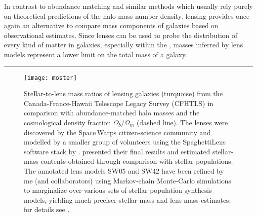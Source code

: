 In contrast to abundance matching and similar methods which usually rely purely
on theoretical predictions of the halo mass number density, lensing provides
once again an alternative to compare mass components of galaxies based on
observational estimates.  Since lenses can be used to probe the distribution of
every kind of matter in galaxies, especially within the , masses
inferred by lens models represent a lower limit on the total mass of a galaxy.  




\par\noindent\rule{\textwidth}{0.8pt}




\begin{figure}[h]%
    \centering%
    \texttt{[image: moster]}%
    \caption[Stellar-to-lens mass ratios of lensing galaxies]{Stellar-to-lens
        mass ratios of lensing galaxies (turquoise) from the
        Canada-France-Hawaii Telescope Legacy Survey (CFHTLS) in comparison with
        abundance-matched halo masses \cite[blue line; cf. Moster et
        al.][]{Moster12} and the cosmological density fraction
        $\Omega_{b}/\Omega_{m}$ (dashed line).  The lenses were discovered by
        the Space\,Warps citizen-science community and modelled by a smaller
        group of volunteers using the SpaghettiLens software stack by
        .   presented their final results and
        estimated stellar-mass contents obtained through comparison with stellar
        populations.  The annotated lens models SW05 and SW42 have been refined
        by me (and collaborators) using Markov-chain Monte-Carlo simulations to
        marginalize over various sets of stellar population synthesis models,
        yielding much preciser stellar-mass and lens-mass estimates; for details
        see .  }%
\end{figure}%